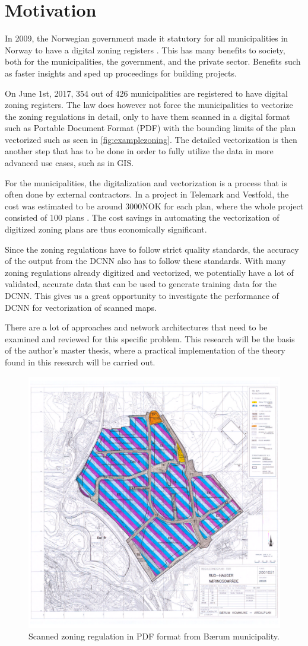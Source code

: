 \chapter{Motivation}\label{chp:motivation}
In 2009, the Norwegian government made it statutory for all municipalities in Norway to have a digital zoning registers \cite{Kommunaltplanregister2009}. This has many benefits to society, both for the municipalities, the government, and the private sector. Benefits such as faster insights and sped up proceedings for building projects. 

On June 1st, 2017, 354 out of 426 municipalities are registered to have digital zoning registers. The law does however not force the municipalities to vectorize the zoning regulations in detail, only to have them scanned in a digital format such as Portable Document Format (PDF) with the bounding limits of the plan vectorized such as seen in \autoref{fig:examplezoning}. The detailed vectorization is then another step that has to be done in order to fully utilize the data in more advanced use cases, such as in GIS.

For the municipalities, the digitalization and vectorization is a process that is often done by external contractors. In a project in Telemark and Vestfold, the cost was estimated to be around 3000NOK for each plan, where the whole project consisted of 100 plans \cite{Bo2009}. The cost savings in automating the vectorization of digitized zoning plans are thus economically significant. 

Since the zoning regulations have to follow strict quality standards, the accuracy of the output from the DCNN also has to follow these standards. With many zoning regulations already digitized and vectorized, we potentially have a lot of validated, accurate data that can be used to generate training data for the DCNN. This gives us a great opportunity to investigate the performance of DCNN for vectorization of scanned maps. 

There are a lot of approaches and network architectures that need to be examined and reviewed for this specific problem. This research will be the basis of the author's master thesis, where a practical implementation of the theory found in this research will be carried out. 

\begin{figure}[H]
	\centering
	\includegraphics[width=0.8\linewidth]{fig/eksempel_plan.pdf}
	\caption{Scanned zoning regulation in PDF format from Bærum municipality. }
	\label{fig:examplezoning}
\end{figure}
